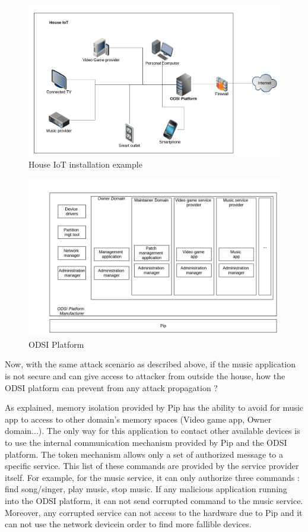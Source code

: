 \documentclass[conference]{IEEEtran}
\begin{document}
\begin{figure}[h]
	\centering
	\includegraphics[width=1\linewidth]{figures/HouseIOT}
	\caption[House IoT installation example]{House IoT installation example}
	\label{fig:houseiot}
\end{figure}
\begin{figure}[h]
	\centering
	\includegraphics[width=1\linewidth]{figures/ODSIplatform}
	\caption{ODSI Platform}
	\label{fig:odsiplatform}
\end{figure}


Now, with the same attack scenario as described above, if the music application is not secure and can give access to attacker from outside the house, how the ODSI platform 
can prevent from any attack propagation ? 

As explained, memory isolation provided by Pip has the ability to avoid for music app to access to other domain's memory spaces (Video game app, Owner domain...). The only way for this application to contact other available devices is to use the internal communication mechanism provided by Pip and the ODSI platform. The token mechanism allows only a set of authorized message to a specific service. This list of these commands are provided by the service provider itself. For example, for the music service, it can only authorize three commands : find song/singer, play music, stop music. If any malicious application running into the ODSI platform, it can not send corrupted command to the music service. Moreover, any corrupted service can not access to the hardware due to Pip and it can not use the network devicein order to find more fallible devices. 
\end{document}

